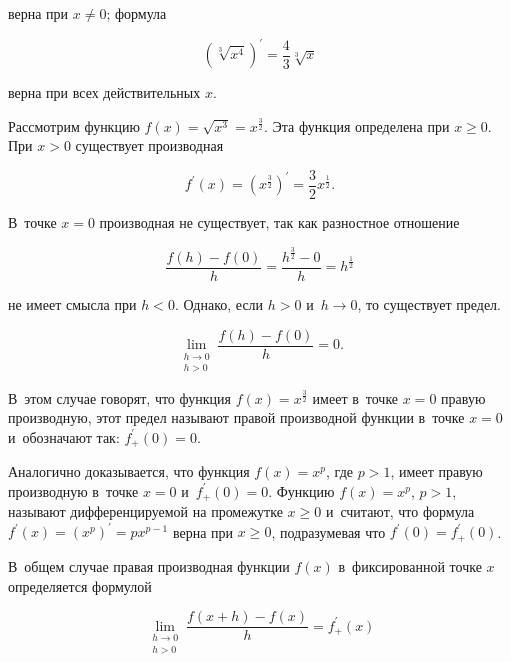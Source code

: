 \noindent
верна при $x \ne 0$; формула

\begin{equation*} 
\displaystyle \left( \sqrt[3]{x^{4}} \right)^\prime = \frac{4}{3}\sqrt[3]{x}
\end{equation*}

\noindent
верна при всех действительных $x$.

Рассмотрим функцию $f(x) = \sqrt{x^{3}} = x^{\frac{3}{2}}$.
Эта функция определена при $x \geqslant 0$. При $x > 0$ существует производная

\begin{equation*}
f^\prime (x) = \left( x^{\frac{3}{2}} \right)^\prime = \frac{3}{2} x^{\frac{1}{2}}.
\end{equation*}

\noindent
В~точке $x = 0$ производная не существует, так как разностное отношение

\begin{equation*}
\displaystyle 
\frac{f(h) - f(0)}{h} = \frac{h^{\frac{3}{2}} - 0}{h} = h^{\frac{1}{2}}
\end{equation*}

\noindent
не имеет смысла при $h < 0$. Однако, если $h > 0$ и~$h \to 0$,
то существует предел.

\begin{equation*}
\displaystyle \lim_{\substack{h \to 0 \\ h > 0}} \frac{f(h) - f(0)}{h} = 0.
\end{equation*}

В~этом случае говорят, что функция $f(x) = x^{\frac{3}{2}}$ имеет в~точке $x = 0$
правую производную, этот предел называют правой производной функции в~точке $x = 0$
и~обозначают так: $f^\prime_{+} (0) = 0$.

Аналогично доказывается, что функция $f(x) = x^{p}$, где $p > 1$, 
имеет правую производную в~точке $x = 0$ и~$f^\prime_{+} (0) = 0$.
Функцию $f(x) = x^{p}$, $p > 1$, называют дифференцируемой на промежутке $x \geqslant 0$
и~считают, что формула $f^\prime (x) = \left( x^{p} \right)^\prime = px^{p-1}$
верна при $x \geqslant 0$, подразумевая что $f^\prime (0) = f^\prime_{+} (0)$.

В~общем случае правая производная функции $f(x)$ в~фиксированной точке $x$
определяется формулой

\begin{equation*}
\displaystyle \lim_{\substack{h \to 0 \\ h > 0}} \frac{f(x+h) - f(x)}{h} = f^\prime_{+}(x)
\end{equation*}

